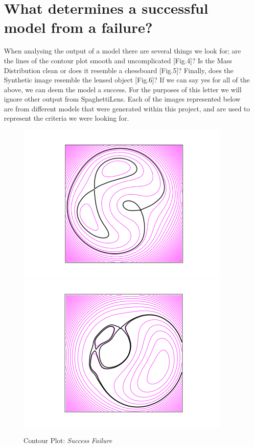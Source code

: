 \documentclass{article}
\begin{document}
\section{What determines a successful model from a failure?}

When analysing the output of a model there are several things we look for; are 
the lines of the contour plot smooth and uncomplicated [Fig.4]? Is the Mass Distribution 
clean or does it resemble a chessboard [Fig.5]? Finally, does the Synthetic image 
resemble the lensed object [Fig.6]? If we can say yes for all of the above, we 
can deem the model a success. For the purposes of this letter we will ignore other 
output from SpaghettiLens. Each of the images represented below are from different 
models that were generated within this project, and are used to represent the criteria 
we were looking for. 

\begin{figure}
\centering
\includegraphics[width=300pt]{fig/simsModeling-fig004.png}
\includegraphics[width=300pt]{fig/simsModeling-fig005.png}
\caption{Contour Plot: {\color{color02} \emph{Success}}
  {\color{color02} \emph{Failure}}}
\end{figure}
\end{document}
